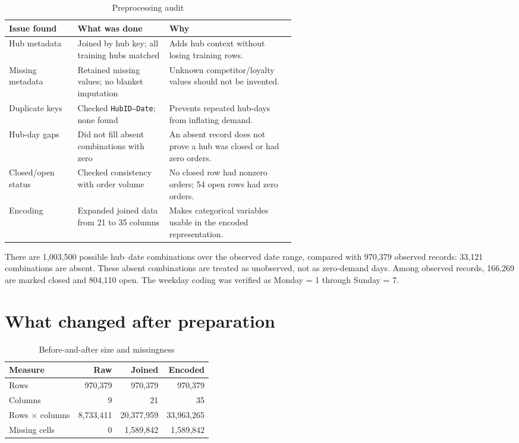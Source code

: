 \documentclass[10pt,a4paper,twocolumn]{article}
\begin{document}
\begin{table}[t]
\centering
\caption{Preprocessing audit}
\label{tab:prep}
\scriptsize
\begin{tabularx}{\linewidth}{@{}p{0.24\linewidth}p{0.32\linewidth}X@{}}
\toprule
Issue found & What was done & Why\\
\midrule
Hub metadata & Joined by hub key; all training hubs matched & Adds hub context without losing training rows.\\
Missing metadata & Retained missing values; no blanket imputation & Unknown competitor/loyalty values should not be invented.\\
Duplicate keys & Checked \texttt{HubID--Date}; none found & Prevents repeated hub-days from inflating demand.\\
Hub-day gaps & Did not fill absent combinations with zero & An absent record does not prove a hub was closed or had zero orders.\\
Closed/open status & Checked consistency with order volume & No closed row had nonzero orders; 54 open rows had zero orders.\\
Encoding & Expanded joined data from 21 to 35 columns & Makes categorical variables usable in the encoded representation.\\
\bottomrule
\end{tabularx}
\end{table}

There are 1,003,500 possible hub--date combinations over the observed date range, compared with 970,379 observed records: 33,121 combinations are absent. These absent combinations are treated as unobserved, not as zero-demand days. Among observed records, 166,269 are marked closed and 804,110 open. The weekday coding was verified as Monday = 1 through Sunday = 7.

\section{What changed after preparation}
\begin{table}[t]
\centering
\caption{Before-and-after size and missingness}
\label{tab:beforeafter}
\scriptsize
\begin{tabular}{lrrr}
\toprule
Measure & Raw & Joined & Encoded\\
\midrule
Rows & 970,379 & 970,379 & 970,379\\
Columns & 9 & 21 & 35\\
Rows $\times$ columns & 8,733,411 & 20,377,959 & 33,963,265\\
Missing cells & 0 & 1,589,842 & 1,589,842\\
\bottomrule
\end{tabular}
\end{table}
\end{document}
